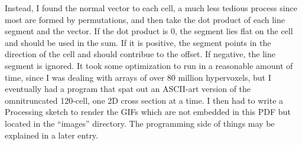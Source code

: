 \documentclass{article}
\begin{document}
Instead, I found the normal vector to each cell,
a much less tedious process since most are formed by permutations,
and then take the dot product of each line segment and the vector.
If the dot product is 0, the segment lies flat on the cell and should be used in the sum.
If it is positive, the segment points in the direction of the cell
and should contribue to the offset.
If negative, the line segment is ignored.
It took some optimization to run in a reasonable amount of time,
since I was dealing with arrays of over 80 million hypervoxels,
but I eventually had a program that spat out an ASCII-art version of the omnitruncated 120-cell,
one 2D cross section at a time.
I then had to write a Processing sketch to render the GIFs which are not embedded in this PDF
but located in the ``images'' directory.
The programming side of things may be explained in a later entry.
\end{document}
